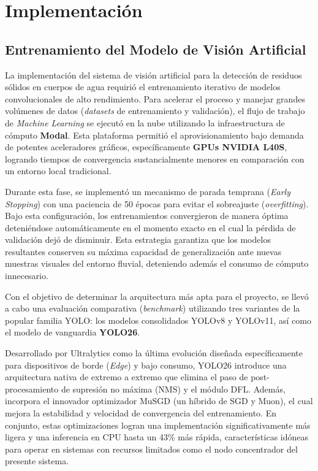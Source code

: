 \chapter{Implementación}

\section{Entrenamiento del Modelo de Visión Artificial}
\label{sec:entrenamiento_del_modelo_de_vision_artificial}

La implementación del sistema de visión artificial para la detección de residuos sólidos en cuerpos de agua requirió el entrenamiento iterativo de modelos convolucionales de alto rendimiento. Para acelerar el proceso y manejar grandes volúmenes de datos (\textit{datasets} de entrenamiento y validación), el flujo de trabajo de \textit{Machine Learning} se ejecutó en la nube utilizando la infraestructura de cómputo \textbf{Modal}. Esta plataforma permitió el aprovisionamiento bajo demanda de potentes aceleradores gráficos, específicamente \textbf{GPUs NVIDIA L40S}, logrando tiempos de convergencia sustancialmente menores en comparación con un entorno local tradicional.

Durante esta fase, se implementó un mecanismo de parada temprana (\textit{Early Stopping}) con una paciencia de 50 épocas para evitar el sobreajuste (\textit{overfitting}). Bajo esta configuración, los entrenamientos convergieron de manera óptima deteniéndose automáticamente en el momento exacto en el cual la pérdida de validación dejó de disminuir. Esta estrategia garantiza que los modelos resultantes conserven su máxima capacidad de generalización ante nuevas muestras visuales del entorno fluvial, deteniendo además el consumo de cómputo innecesario.

Con el objetivo de determinar la arquitectura más apta para el proyecto, se llevó a cabo una evaluación comparativa (\textit{benchmark}) utilizando tres variantes de la popular familia YOLO: los modelos consolidados YOLOv8 y YOLOv11, así como el modelo de vanguardia \textbf{YOLO26}.

Desarrollado por Ultralytics como la última evolución diseñada específicamente para dispositivos de borde (\textit{Edge}) y bajo consumo, YOLO26 introduce una arquitectura nativa de extremo a extremo que elimina el paso de post-procesamiento de supresión no máxima (NMS) y el módulo DFL. Además, incorpora el innovador optimizador MuSGD (un híbrido de SGD y Muon), el cual mejora la estabilidad y velocidad de convergencia del entrenamiento. En conjunto, estas optimizaciones logran una implementación significativamente más ligera y una inferencia en CPU hasta un 43\% más rápida, características idóneas para operar en sistemas con recursos limitados como el nodo concentrador del presente sistema.

